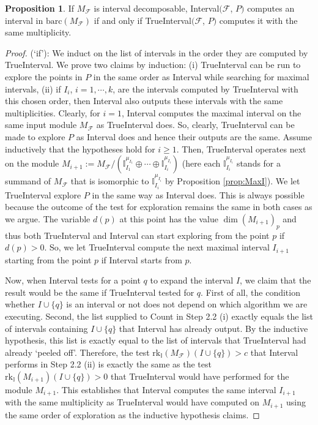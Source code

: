 \documentclass[11pt]{article}
\theoremstyle{definition}
\newtheorem{proposition}[theorem]{Proposition}
\newcommand{\intrk}{\mathrm{rk}_{\mathbb{I}}}
\newcommand{\I}{\mathbb{I}}
\newcommand{\Pb}{P}
\newcommand{\Fcal}{\mathcal{F}}
\newcommand{\barc}{\mathrm{barc}}
\begin{document}
\begin{proposition}\label{prop:two algorithm coincides}
If $M_{\mathcal F}$ is interval decomposable,
{\sc Interval}$(\mathcal F$, $\Pb)$ computes an interval in $\barc(M_{\Fcal})$ if and only if {\sc TrueInterval}$(\mathcal F$, $\Pb)$ computes it with the same multiplicity.
\end{proposition}
\begin{proof}
(`if'): We induct on the list of intervals in the order they are computed
by {\sc TrueInterval}. We prove two claims by induction: (i) {\sc TrueInterval}
can be run to explore the points in $\Pb$ in the same order as {\sc Interval}
while searching for maximal intervals, (ii) if $I_i$, $i=1,\cdots, k$, are 
the intervals computed by {\sc TrueInterval} with this chosen order, 
then {\sc Interval} also outputs these intervals with the same multiplicities. 
Clearly, for $i=1$, {\sc Interval} computes the maximal
interval on the same input module $M_{\mathcal F}$ as {\sc TrueInterval} does.
So, clearly, {\sc TrueInterval} can be made to explore $\Pb$ as {\sc Interval}
does and hence their outputs are the same. 
Assume inductively that the hypotheses
hold for $i\geq 1$. Then, {\sc TrueInterval} 
operates next on the module $M_{i+1}:=M_{\mathcal F}/(\I_{I_1}^{\mu_{I_1}}\oplus\cdots\oplus \I_{I_i}^{\mu_{I_i}})$ (here each $\I_{I_i}^{\mu_{I_i}}$ stands for a summand of $M_{\Fcal}$ that is isomorphic to $\I_{I_i}^{\mu_{I_i}}$ by Proposition \ref{prop:MaxI}). We let {\sc TrueInterval} explore $\Pb$ in the same way
as {\sc Interval} does. This is always possible because the outcome of the
test for exploration remains the same in both cases as we argue.
The variable $d(p)$ at this point has the value $\dim (M_{i+1})_p$ and thus
both {\sc TrueInterval} and {\sc Interval} can start exploring from the
point $p$ if $d(p)>0$. So, we 
let {\sc TrueInterval} compute the next maximal interval $I_{i+1}$ starting from the point $p$ 
if {\sc Interval} starts from $p$.

Now, when {\sc Interval} tests for a point $q$ to expand the
interval $I$, we claim that the result would be the same if {\sc TrueInterval}
tested for $q$.
First of all, the condition whether $I\cup\{q\}$ is an interval or not does not
depend on which algorithm we are executing. Second, 
the list supplied to {\sc Count} in Step 2.2 (i) exactly
equals the list of intervals containing $I\cup\{q\}$
that {\sc Interval} has already output.
By the inductive hypothesis, this list
is exactly equal to the list of intervals that {\sc TrueInterval} had already `peeled off'. Therefore, the test
$\intrk(M_{\mathcal F})(I\cup\{q\})>c$ that {\sc Interval} performs in Step 2.2 (ii) is exactly
the same as the test $\intrk(M_{i+1})(I\cup\{q\})>0$ that {\sc TrueInterval} would
have performed for the module $M_{i+1}$. This establishes that
{\sc Interval} computes the same interval $I_{i+1}$ with the same multiplicity
as {\sc TrueInterval} would have
computed on $M_{i+1}$ using the same order of exploration as the inductive hypothesis claims.


\end{proof}
\end{document}
